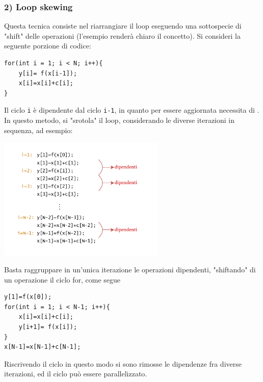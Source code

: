 \documentclass[10pt, letterpaper]{report}
\begin{document}
\subsubsection{2) Loop skewing}
Questa tecnica consiste nel riarrangiare il loop eseguendo una sottospecie di "shift" delle operazioni (l'esempio renderà chiaro il concetto). Si consideri la seguente porzione di codice:
\begin{lstlisting}[style=CStyle]
for(int i = 1; i < N; i++){
    y[i]= f(x[i-1]);
    x[i]=x[i]+c[i];
}
\end{lstlisting}
Il ciclo \texttt{i} è dipendente dal ciclo \texttt{i-1}, in quanto  per essere aggiornata necessita di . In questo metodo, si "srotola" il loop, considerando le diverse iterazioni in sequenza, ad esempio:
\begin{center}
    \includegraphics[width=0.6\textwidth ]{images/skewing.pdf}
\end{center}
Basta raggruppare in un'unica iterazione le operazioni dipendenti, "shiftando" di un operazione il ciclo for, come segue
\begin{lstlisting}[style=CStyle]
y[1]=f(x[0]);
for(int i = 1; i < N-1; i++){
    x[i]=x[i]+c[i];
    y[i+1]= f(x[i]);
}
x[N-1]=x[N-1]+c[N-1];
\end{lstlisting}
Riscrivendo il ciclo in questo modo si sono rimosse le dipendenze fra diverse iterazioni, ed il ciclo può essere parallelizzato.
\end{document}

